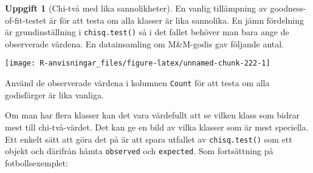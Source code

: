 \documentclass[
]{book}
\newenvironment{Shaded}{\begin{snugshade}}{\end{snugshade}}
\newcommand{\AttributeTok}[1]{\textcolor[rgb]{0.77,0.63,0.00}{#1}}
\newcommand{\DecValTok}[1]{\textcolor[rgb]{0.00,0.00,0.81}{#1}}
\newcommand{\FloatTok}[1]{\textcolor[rgb]{0.00,0.00,0.81}{#1}}
\newcommand{\FunctionTok}[1]{\textcolor[rgb]{0.00,0.00,0.00}{#1}}
\newcommand{\NormalTok}[1]{#1}
\newcommand{\OtherTok}[1]{\textcolor[rgb]{0.56,0.35,0.01}{#1}}
\newcommand{\SpecialCharTok}[1]{\textcolor[rgb]{0.00,0.00,0.00}{#1}}
\newcommand{\StringTok}[1]{\textcolor[rgb]{0.31,0.60,0.02}{#1}}
\theoremstyle{definition}
\theoremstyle{definition}
\theoremstyle{definition}
\newtheorem{exercise}{Uppgift}[chapter]
\theoremstyle{definition}
\theoremstyle{remark}
\begin{document}
\begin{exercise}[Chi-två med lika sannolikheter]
En vanlig tillämpning av goodness-of-fit-testet är för att testa om alla klasser är lika sannolika. En jämn fördelning är grundinställning i \texttt{chisq.test()} så i det fallet behöver man bara ange de observerade värdena. En datainsamling om M\&M-godis gav följande antal.

\begin{Shaded}
\end{Shaded}

\begin{center}\texttt{[image: R-anvisningar\_files/figure-latex/unnamed-chunk-222-1]} \end{center}

Använd de observerade värdena i kolumnen \texttt{Count} för att testa om alla godisfärger är lika vanliga.
\end{exercise}

Om man har flera klasser kan det vara värdefullt att se vilken klass som bidrar mest till chi-två-värdet. Det kan ge en bild av vilka klasser som är mest speciella. Ett enkelt sätt att göra det på är att spara utfallet av \texttt{chisq.test()} som ett objekt och därifrån hämta \texttt{observed} och \texttt{expected}. Som fortsättning på fotbollsexemplet:

\begin{Shaded}
\end{Shaded}
\end{document}

